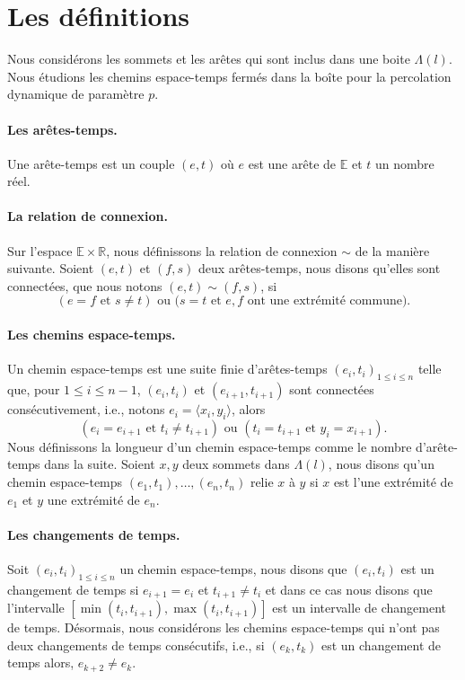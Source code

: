 \documentclass[titlepage,a4paper,12pt]{article}
\newcounter{d}
\newcounter{t}
\newcounter{p}
\newcounter{c}
\newcounter{a}
\newcounter{l}
\begin{document}
\section{Les définitions}
Nous considérons les sommets et les arêtes qui sont inclus dans une boite $\Lambda(l)$. Nous étudions les chemins espace-temps fermés dans la boîte pour la percolation dynamique de paramètre $p$.
\paragraph{Les arêtes-temps.}
Une arête-temps est un couple $(e,t)$ où $e$ est une arête de $\mathbb{E}$ et $t$ un nombre réel. 

\paragraph{La relation de connexion.} Sur l'espace $\mathbb{E}\times \mathbb{R}$, nous définissons la relation de connexion $\sim$ de la manière suivante. Soient $(e,t)$ et $(f,s)$ deux arêtes-temps, nous disons qu'elles sont connectées, que nous notons $(e,t)\sim(f,s)$, si $$(e=f \text{ et } s\neq t)\text{ ou (}s=t\text{ et }e,f\text{ ont une extrémité commune)}.$$
\paragraph{Les chemins espace-temps.} Un chemin espace-temps est une suite finie d'arêtes-temps $(e_i,t_i)_{1\leqslant i\leqslant n}$ telle que, pour $ 1\leqslant i \leqslant n-1$, $(e_i,t_i)$ et $(e_{i+1},t_{i+1})$ sont connectées consécutivement, i.e., notons $e_i = \langle x_i,y_i\rangle$, alors
$$ (e_i = e_{i+1}\text{ et }t_i \neq t_{i+1})\text{ ou }(t_i = t_{i+1} \text{ et } y_i = x_{i+1})
.$$ Nous définissons la longueur d'un chemin espace-temps comme le nombre d'arête-temps dans la suite. Soient $x,y$ deux sommets dans $\Lambda(l)$, nous disons qu'un chemin espace-temps $(e_1,t_1),\dots,(e_n,t_n)$ relie $x$ à $y$ si $x$ est l'une extrémité de $e_1$ et $y$ une extrémité de $e_n$.
\paragraph{Les changements de temps.} Soit $(e_i,t_i)_{1\leqslant i \leqslant n}$ un chemin espace-temps, nous disons que $(e_i,t_i)$ est un changement de temps si $e_{i+1} = e_i$ et $t_{i+1}\neq t_i$ et dans ce cas nous disons que l'intervalle $[\min(t_i,t_{i+1}),\max(t_i,t_{i+1})]$ est un intervalle de changement de temps. Désormais, nous considérons les chemins espace-temps qui n'ont pas deux changements de temps consécutifs, i.e., si $(e_k,t_k)$ est un changement de temps alors, $e_{k+2} \neq e_k$.
\end{document}
